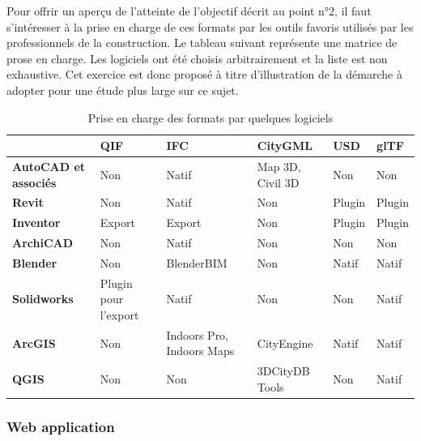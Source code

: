 Pour offrir un aperçu de l'atteinte de l'objectif décrit au point n°2, il faut s'intéresser à la prise en charge de ces formats par les outils favoris utilisés par les professionnels de la construction. Le tableau suivant représente une matrice de prose en charge. Les logiciels ont été choisis arbitrairement et la liste est non exhaustive. Cet exercice est donc proposé à titre d'illustration de la démarche à adopter pour une étude plus large sur ce sujet.

\begin{table}[!h]
    \centering
    \caption{Prise en charge des formats par quelques logiciels}
    \renewcommand{\arraystretch}{1.25} 
    \small
    \begin{tabularx}{\textwidth}{|l|X|X|X|X|X|} 
        \hline
        \rowcolor{white!75!black} \textbf{} & \textbf{QIF} & \textbf{IFC} & \textbf{CityGML} & \textbf{USD} & \textbf{glTF}\\
        \hline
        \textbf{AutoCAD et associés} & Non & Natif & Map 3D, Civil 3D & Non & Non \\
        \hline
        \textbf{Revit} & Non & Natif & Non & Plugin\cite{prototechsolutionsCustomPlugins} & Plugin\cite{prototechsolutionsCustomPlugins} \\
        \hline
        \textbf{Inventor} & Export & Export & Non & Plugin\cite{prototechsolutionsCustomPlugins2} & Plugin\cite{prototechsolutionsCustomPlugins2} \\
        \hline
        \textbf{ArchiCAD} & Non & Natif & Non & Non & Non \\
        \hline
        \textbf{Blender} & Non & BlenderBIM & Non & Natif & Natif \\
        \hline
        \textbf{Solidworks} & Plugin pour l'export\cite{capvidiaExportNeutral} & Natif & Non & Non & Natif \\
        \hline
        \textbf{ArcGIS} & Non & Indoors Pro, Indoors Maps & CityEngine & Natif & Natif \\
        \hline
        \textbf{QGIS} & Non & Non & 3DCityDB Tools & Non & Natif \\
        \hline
    \end{tabularx}
\end{table}

\subsubsection{Web application}

